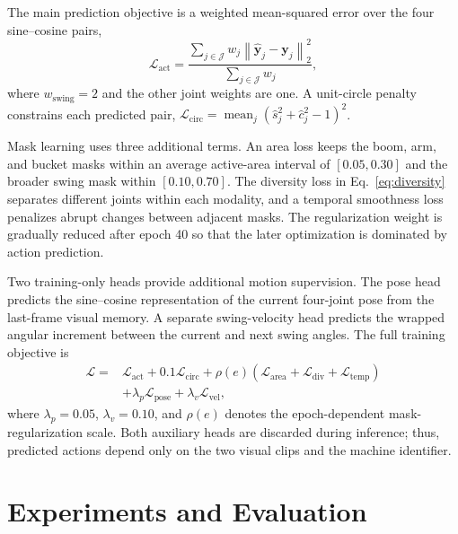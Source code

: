 \documentclass[journal]{IEEEtran}
\begin{document}
The main prediction objective is a weighted mean-squared error over the four
sine--cosine pairs,
\begin{equation}
\mathcal{L}_{\mathrm{act}}=
\frac{\sum_{j\in\mathcal{J}}w_j
\left\|\widehat{\mathbf{y}}_{j}-\mathbf{y}_{j}\right\|_2^2}
{\sum_{j\in\mathcal{J}}w_j},
\label{eq:action_loss}
\end{equation}
where $w_{\mathrm{swing}}=2$ and the other joint weights are one. A unit-circle
penalty constrains each predicted pair,
$\mathcal{L}_{\mathrm{circ}}=\operatorname{mean}_{j}
(\hat{s}_{j}^{2}+\hat{c}_{j}^{2}-1)^{2}$.

Mask learning uses three additional terms. An area loss keeps the boom, arm,
and bucket masks within an average active-area interval of $[0.05,0.30]$ and
the broader swing mask within $[0.10,0.70]$. The diversity loss in
Eq.~\eqref{eq:diversity} separates different joints within each modality, and
a temporal smoothness loss penalizes abrupt changes between adjacent masks.
The regularization weight is gradually reduced after epoch 40 so that the
later optimization is dominated by action prediction.

Two training-only heads provide additional motion supervision. The pose head
predicts the sine--cosine representation of the current four-joint pose from
the last-frame visual memory. A separate swing-velocity head predicts the
wrapped angular increment between the current and next swing angles. The full
training objective is
\begin{equation}
\begin{split}
\mathcal{L}={}&\mathcal{L}_{\mathrm{act}}
+0.1\mathcal{L}_{\mathrm{circ}}
+\rho(e)\left(\mathcal{L}_{\mathrm{area}}
+\mathcal{L}_{\mathrm{div}}+\mathcal{L}_{\mathrm{temp}}\right)\\
&+\lambda_{p}\mathcal{L}_{\mathrm{pose}}
+\lambda_{v}\mathcal{L}_{\mathrm{vel}},
\end{split}
\label{eq:total_loss}
\end{equation}
where $\lambda_p=0.05$, $\lambda_v=0.10$, and $\rho(e)$ denotes the
epoch-dependent mask-regularization scale. Both auxiliary heads are discarded
during inference; thus, predicted actions depend only on the two visual clips
and the machine identifier.


\section{Experiments and Evaluation}
\label{sec:experiments}
\end{document}

